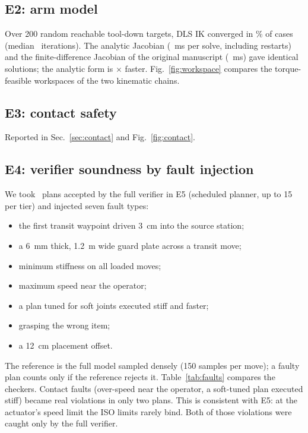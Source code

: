 \documentclass[journal]{IEEEtran}
\begin{document}
\subsection{E2: arm model}
Over 200 random reachable tool-down targets, DLS IK converged in \ikSuccPct\% of cases (median \ikItMed\ iterations). The analytic Jacobian (\ikTimeA~ms per solve, including restarts) and the finite-difference Jacobian of the original manuscript (\ikTimeFD~ms) gave identical solutions; the analytic form is \ikSpeedup$\times$ faster. Fig.~\ref{fig:workspace} compares the torque-feasible workspaces of the two kinematic chains.

\subsection{E3: contact safety}
Reported in Sec.~\ref{sec:contact} and Fig.~\ref{fig:contact}.

\subsection{E4: verifier soundness by fault injection}\label{sec:faults}
We took \nFaultPlans\ plans accepted by the full verifier in E5 (scheduled planner, up to 15 per tier) and injected seven fault types:
\begin{itemize}
\item the first transit waypoint driven \SI{3}{cm} into the source station;
\item a \SI{6}{mm} thick, \SI{1.2}{m} wide guard plate across a transit move;
\item minimum stiffness on all loaded moves;
\item maximum speed near the operator;
\item a plan tuned for soft joints executed stiff and faster;
\item grasping the wrong item;
\item a \SI{12}{cm} placement offset.
\end{itemize}
The reference is the full model sampled densely (150 samples per move); a faulty plan counts only if the reference rejects it. Table~\ref{tab:faults} compares the checkers. \faultSummary{} Contact faults (over-speed near the operator, a soft-tuned plan executed stiff) became real violations in only two plans. This is consistent with E5: at the actuator's speed limit the ISO limits rarely bind. Both of those violations were caught only by the full verifier.
\end{document}
